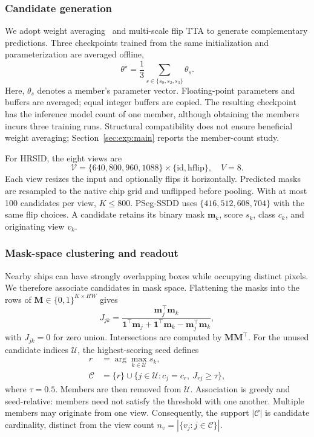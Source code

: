 \subsubsection{Candidate generation}
We adopt weight averaging~\cite{modelsoups2022} and multi-scale flip TTA to generate complementary predictions. Three checkpoints trained from the same initialization and parameterization are averaged offline,
\begin{equation}\label{eq:soup}
\theta^{\star}=\frac{1}{3}\sum_{s\in\{s_0,s_2,s_3\}}\theta_s.
\end{equation}
Here, $\theta_s$ denotes a member's parameter vector. Floating-point parameters and buffers are averaged; equal integer buffers are copied. The resulting checkpoint has the inference model count of one member, although obtaining the members incurs three training runs. Structural compatibility does not ensure beneficial weight averaging; Section~\ref{sec:exp:main} reports the member-count study.

For HRSID, the eight views are
\begin{equation}\label{eq:views}
\mathcal{V}=\{640,800,960,1088\}\times\{\mathrm{id},\mathrm{hflip}\},
\quad V=8.
\end{equation}
Each view resizes the input and optionally flips it horizontally. Predicted masks are resampled to the native chip grid and unflipped before pooling. With at most 100 candidates per view, $K\le800$. PSeg-SSDD uses $\{416,512,608,704\}$ with the same flip choices. A candidate retains its binary mask $\mathbf{m}_k$, score $s_k$, class $c_k$, and originating view $v_k$.

\subsubsection{Mask-space clustering and readout}
Nearby ships can have strongly overlapping boxes while occupying distinct pixels. We therefore associate candidates in mask space. Flattening the masks into the rows of $\mathbf{M}\in\{0,1\}^{K\times HW}$ gives
\begin{equation}\label{eq:iou}
J_{jk}=\frac{\mathbf{m}_j^{\top}\mathbf{m}_k}
{\mathbf{1}^{\top}\mathbf{m}_j+\mathbf{1}^{\top}\mathbf{m}_k-\mathbf{m}_j^{\top}\mathbf{m}_k},
\end{equation}
with $J_{jk}=0$ for zero union. Intersections are computed by $\mathbf{M}\mathbf{M}^{\top}$. For the unused candidate indices $\mathcal{U}$, the highest-scoring seed defines
\begin{equation}\label{eq:cluster}
\begin{split}
r&=\arg\max_{k\in\mathcal{U}}s_k,\\
\mathcal{C}&=\{r\}\cup\{j\in\mathcal{U}:c_j=c_r,\ J_{rj}\ge\tau\},
\end{split}
\end{equation}
where $\tau=0.5$. Members are then removed from $\mathcal{U}$. Association is greedy and seed-relative: members need not satisfy the threshold with one another. Multiple members may originate from one view. Consequently, the support $|\mathcal{C}|$ is candidate cardinality, distinct from the view count $n_v=|\{v_j:j\in\mathcal{C}\}|$.

